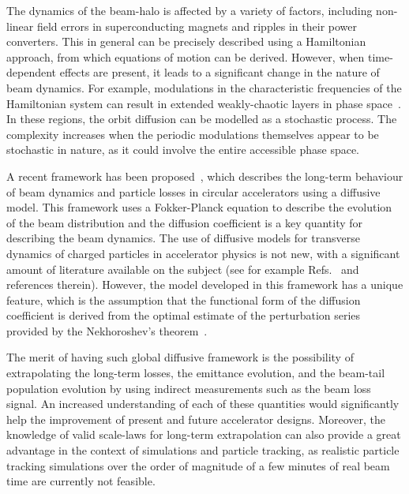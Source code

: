 The dynamics of the beam-halo is affected by a variety of factors, including non-linear field errors in superconducting magnets and ripples in their power converters. This in general can be precisely described using a Hamiltonian approach, from which equations of motion can be derived. However, when time-dependent effects are present, it leads to a significant change in the nature of beam dynamics. For example, modulations in the characteristic frequencies of the Hamiltonian system can result in extended weakly-chaotic layers in phase space~\cite{NEISHTADT1991}. In these regions, the orbit diffusion can be modelled as a stochastic process. The complexity increases when the periodic modulations themselves appear to be stochastic in nature, as it could involve the entire accessible phase space.

A recent framework has been proposed~\cite{Bazzani:2019lse,bazzani2020diffusion}, which describes the long-term behaviour of beam dynamics and particle losses in circular accelerators using a diffusive model. This framework uses a Fokker-Planck equation to describe the evolution of the beam distribution and the diffusion coefficient is a key quantity for describing the beam dynamics. The use of diffusive models for transverse dynamics of charged particles in accelerator physics is not new, with a significant amount of literature available on the subject (see for example Refs.~{\cite{Burnod:205343,Meddahi:223301,PhysRevLett.68.33,gerasimov1992applicability,MESS1994279,zimmermann1994transverse,PhysRevLett.77.1051,PhysRevSTAB.5.074001,flilleriii:pac03-rpag004,stancari2011diffusion,stancari:ipac11-tupz033,PhysRevSTAB.15.101001,Stancari:1637929}} and references therein). However, the model developed in this framework has a unique feature, which is the assumption that the functional form of the diffusion coefficient is derived from the optimal estimate of the perturbation series provided by the Nekhoroshev's theorem~\cite{Nekhoroshev:1977aa,Bazzani:1990aa,Turchetti:1990aa}.

The merit of having such global diffusive framework is the possibility of extrapolating the long-term losses, the emittance evolution, and the beam-tail population evolution by using indirect measurements such as the beam loss signal. An increased understanding of each of these quantities would significantly help the improvement of present and future accelerator designs. Moreover, the knowledge of valid scale-laws for long-term extrapolation can also provide a great advantage in the context of simulations and particle tracking, as realistic particle tracking simulations over the order of magnitude of a few minutes of real beam time are currently not feasible.


